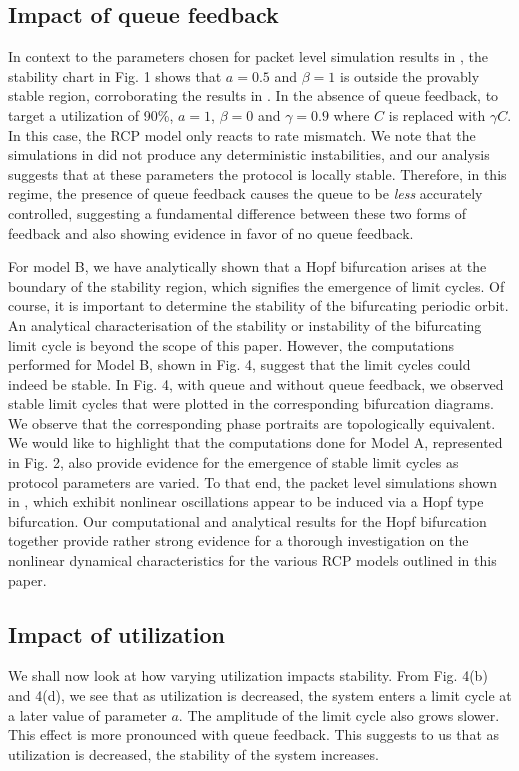 \documentclass[conference]{IEEEtran}
\begin{document}
\subsection{Impact of queue feedback}

In context to the parameters chosen for packet level simulation results in \cite[Fig.~5]{krv}, the stability chart in Fig. 1 shows that $a=0.5$ and $\beta = 1$ is outside the provably 
stable region, corroborating the results in \cite[Fig.~5]{krv}. In the absence of queue feedback, to target a utilization of 90\%, $a = 1$, 
$\beta = 0$ and $\gamma = 0.9$ where $C$ is replaced with $\gamma C$. In this case, the RCP model only 
reacts to rate mismatch. We note that the simulations in \cite{krv} did not produce any deterministic instabilities, and our analysis suggests that at these parameters the protocol is locally stable. Therefore, in this regime, the presence of queue feedback causes the queue 
to be \textit{less} accurately controlled, suggesting a fundamental
difference between these two forms of feedback and also showing evidence in favor of no queue feedback.

For model B, we have analytically shown that a Hopf bifurcation arises at the boundary of the stability region, 
which signifies the emergence of limit cycles. Of course, it is important to determine the 
stability of the bifurcating periodic orbit. An analytical characterisation of the stability or instability 
of the bifurcating limit cycle is beyond the scope of this paper. However, the computations performed for 
Model B, shown in Fig. 4, suggest that the limit cycles could indeed be stable. In Fig. 4, 
with queue and without queue feedback, we observed stable limit cycles that were plotted in the corresponding 
bifurcation diagrams. We observe that the corresponding phase portraits 
are topologically equivalent. We would like to highlight that the computations done for Model A, represented in Fig. 2, also provide evidence for the emergence of stable limit cycles as protocol parameters are varied. 
To that end, the packet level simulations shown in \cite{krv}, which exhibit nonlinear oscillations appear to be 
induced via a Hopf type bifurcation. Our computational and analytical results for the Hopf 
bifurcation together provide rather strong evidence for a thorough investigation on the nonlinear dynamical 
characteristics for the various RCP models outlined in this paper. 

\subsection{Impact of utilization}
We shall now look 
at how varying utilization impacts stability. From Fig. 4(b) and 4(d), we see that as utilization 
is decreased, the system enters a limit cycle at a later value of parameter $a$. The amplitude 
of the limit cycle also grows slower. This effect is more pronounced with queue feedback. 
This suggests to us that as utilization is decreased, the stability of the system increases. 
\end{document}
